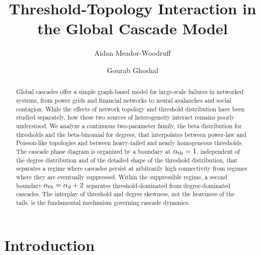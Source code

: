 \documentclass[]{revtex4-2}
\begin{document}
\title{Threshold-Topology Interaction in the Global Cascade Model}
\author{Aidan Meador-Woodruff}
\author{Gourab Ghoshal}
\begin{abstract}
    Global cascades offer a simple graph-based model for large-scale failures in networked systems, from power grids and financial networks to neural avalanches and social contagion. While the effects of network topology and threshold distribution have been studied separately, how these two sources of heterogeneity interact remains poorly understood. We analyze a continuous two-parameter family, the beta distribution for thresholds and the beta-binomial for degrees, that interpolates between power-law and Poisson-like topologies and between heavy-tailed and nearly homogeneous thresholds. The cascade phase diagram is organized by a boundary at $\alpha_{\rm th}=1$, independent of the degree distribution and of the detailed shape of the threshold distribution, that separates a regime where cascades persist at arbitrarily high connectivity from regimes where they are eventually suppressed. Within the suppressible regime, a second boundary $\alpha_{\rm th}=\alpha_d+2$ separates threshold-dominated from degree-dominated cascades. The interplay of threshold and degree skewness, not the heaviness of the tails, is the fundamental mechanism governing cascade dynamics.
\end{abstract}

\maketitle

\section{Introduction}
\end{document}
